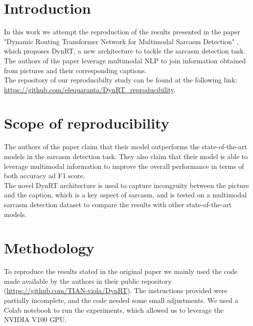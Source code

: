 \section{Introduction}
In this work we attempt the reproduction of the results presented in the paper "Dynamic Routing Transformer Network for Multimodal Sarcasm Detection" \cite{tian-etal-2023-dynamic}, which proposes DynRT, a new architecture to tackle the sarcasm detection task. The authors of the paper leverage multimodal NLP to join information obtained from pictures and their corresponding captions. \\
The repository of our reproducibilty study can be found at the following link:\\
\url{https://github.com/elequaranta/DynRT_reproducibility}.

\section{Scope of reproducibility}
\label{sec:claims}

The authors of the paper claim that their model outperforms the state-of-the-art models in the sarcasm detection task. They also claim that their model is able to leverage multimodal information to improve the overall performance in terms of both accuracy ad F1 score. \\
The novel DynRT architecture is used to capture incongruity between the picture and the caption, which is a key aspect of sarcasm, and is tested on a multimodal sarcasm detection dataset to compare the results with other state-of-the-art models.
 



\section{Methodology}
To reproduce the results stated in the original paper we mainly used the code made available by the authors in their public repository (\url{https://github.com/TIAN-viola/DynRT}). The instructions provided were partially incomplete, and the code needed some small adjustments. We used a Colab notebook to run the experiments, which allowed us to leverage the NVIDIA V100 GPU.

